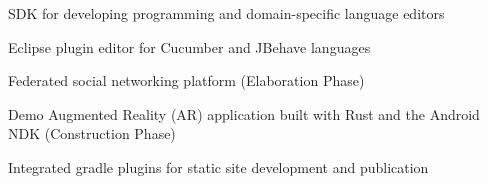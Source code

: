 
SDK for developing programming and domain-specific language editors

\divider

Eclipse plugin editor for Cucumber and JBehave languages

\divider

Federated social networking platform (Elaboration Phase) 

\divider

Demo Augmented Reality (AR) application built with Rust and the Android NDK (Construction Phase) 

\divider

Integrated gradle plugins for static site development and publication